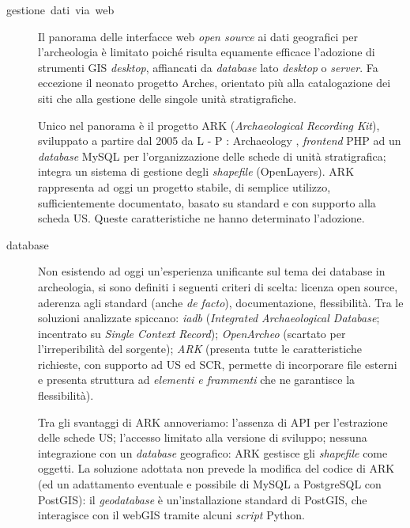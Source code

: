 \documentclass[svgnames,portrait,final,usenames,dvipsnames]{baposter}
\begin{document}
\begin{poster}
{\begin{description}
            \item[gestione~dati~via~web] 

                Il panorama delle interfacce web \textit{open source} ai dati geografici per l'archeologia è limitato poiché risulta equamente efficace l'adozione di strumenti GIS \textit{desktop}, affiancati da \textit{database} lato \textit{desktop} o \textit{server}. Fa eccezione il neonato progetto Arches, orientato più alla catalogazione dei siti che alla gestione delle singole unità stratigrafiche.

                Unico nel panorama è il progetto ARK (\textit{Archaeological Recording Kit}), sviluppato a partire dal 2005 da L - P : Archaeology \cite{ark-framework}, \textit{frontend} PHP ad un \textit{database} MySQL per l'organizzazione delle schede di unità stratigrafica; integra un sistema di gestione degli \textit{shapefile} (OpenLayers). ARK rappresenta ad oggi un progetto stabile, di semplice utilizzo, sufficientemente documentato, basato su standard e con supporto alla scheda US. Queste caratteristiche ne hanno determinato l'adozione.

            \item[database]

                Non esistendo ad oggi un'esperienza unificante sul tema dei database in archeologia, si sono definiti i seguenti criteri di scelta: licenza open source, aderenza agli standard (anche \emph{de facto}), documentazione, flessibilità. Tra le soluzioni analizzate spiccano: \emph{iadb} (\textit{Integrated Archaeological Database}; incentrato su \emph{Single Context Record}); \emph{OpenArcheo} (scartato per l'irreperibilità del sorgente); \emph{ARK} (presenta tutte le caratteristiche richieste, con supporto ad US ed SCR, permette di incorporare file esterni e presenta struttura ad \emph{elementi e frammenti} che ne garantisce la flessibilità).

                Tra gli svantaggi di ARK annoveriamo: l'assenza di API per l'estrazione delle schede US; l'accesso limitato alla versione di sviluppo; nessuna integrazione con un \textit{database} geografico: ARK gestisce gli \textit{shapefile} come oggetti. La soluzione adottata non prevede la modifica del codice di ARK (ed un adattamento eventuale e possibile di MySQL a PostgreSQL con PostGIS): il \textit{geodatabase} è un'installazione standard di PostGIS, che interagisce con il webGIS tramite alcuni \textit{script} Python.
        \end{description}

}
\end{poster}
\end{document}
